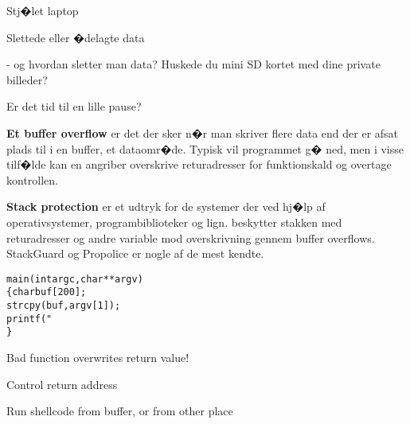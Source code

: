 \documentclass[20pt,landscape,a4paper,footrule]{foils}
\begin{document}


\begin{list1}
\item Stj�let laptop
\item Slettede eller �delagte data
\item - og hvordan sletter man data? Huskede du mini SD kortet med dine private billeder?
\end{list1}



Er det tid til en lille pause?





\begin{list1}
\item {\bfseries Et buffer overflow}
er det der sker n�r man skriver flere data end der er afsat plads til
i en buffer, et dataomr�de. Typisk vil programmet g� ned, men i visse
tilf�lde kan en angriber overskrive returadresser for funktionskald og
overtage kontrollen.
\item {\bfseries Stack protection}
er et udtryk for de systemer der ved hj�lp af operativsystemer,
programbiblioteker og lign. beskytter stakken med returadresser og
andre variable mod overskrivning gennem buffer overflows. StackGuard
og Propolice er nogle af de mest kendte.
\end{list1}



\begin{alltt}
main(int argc, char **argv)
\{      char buf[200];
        strcpy(buf, argv[1]);
        printf("%s\textbackslash{}n",buf);
\}
\end{alltt}





\begin{list1}
\item Bad function overwrites return value!
\item Control return address
\item Run shellcode from buffer, or from other place
\end{list1}
\end{document}
